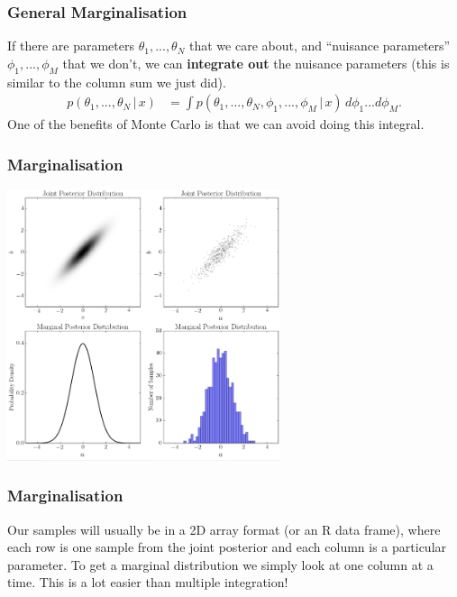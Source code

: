 \documentclass{beamer}
\newcommand{\given}{\,|\,}
\begin{document}
\begin{frame}
\frametitle{General Marginalisation}
If there are parameters $\theta_1, ..., \theta_N$ that we care about,
and ``nuisance parameters'' $\phi_1, ..., \phi_M$ that we don't, we can
{\bf integrate out} the nuisance parameters (this is similar to the column
sum we just did).
\pause
\begin{align}
p(\theta_1, ..., \theta_N \given x)
    &= \int p(\theta_1, ..., \theta_N, \phi_1, ..., \phi_M \given x)
            \, d\phi_1 ... d\phi_M.
\end{align}
\pause
One of the benefits of Monte Carlo is that we can avoid doing this integral.
\end{frame}



\begin{frame}
\frametitle{Marginalisation}
\centering
\includegraphics[width=0.6\textwidth]{images/marginalisation.png}

\end{frame}

\begin{frame}
\frametitle{Marginalisation}
Our samples will usually be in a 2D array format (or an R data frame),
where each row is one sample from the joint posterior and each column is
a particular parameter.
To get a marginal distribution we simply look at one column at a time.
This is a lot easier than multiple integration!

\end{frame}
\end{document}
